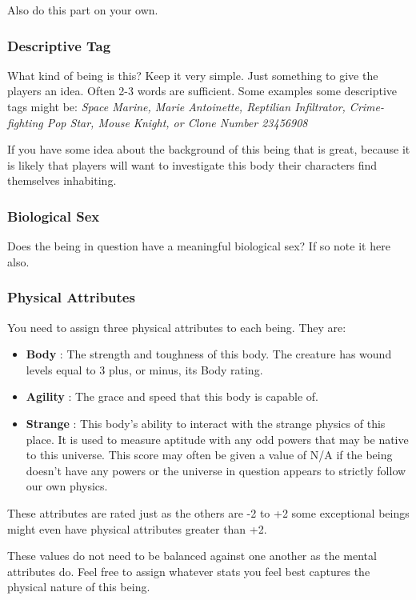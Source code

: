 \documentclass[letterpaper,12pt,landscape,twocolumn]{book}
\begin{document}
Also do this part on your own.

\subsubsection{Descriptive Tag}

What kind of being is this? Keep it very simple. Just something to
give the players an idea. Often 2-3 words are sufficient. Some examples
some descriptive tags might be: \textit{Space Marine, Marie
  Antoinette, Reptilian Infiltrator, Crime-fighting Pop Star, Mouse
  Knight, or Clone Number 23456908} 

If you have some idea about the background of this being that is
great, because it is likely that players will want to investigate this
body their characters find themselves inhabiting.

\subsubsection{Biological Sex}
Does the being in question have a meaningful biological sex? If so
note it here also. 

\subsubsection{Physical Attributes}

You need to assign three physical attributes to each being. They are:

\begin{itemize}
\item \textbf{Body} : The strength and toughness of this body. The
  creature has wound levels equal to 3 plus, or minus, its Body rating.
\item \textbf{Agility} : The grace and speed that this body is capable
  of. 
\item \textbf{Strange} : This body's ability to interact with the
  strange physics of this place. It is used to measure aptitude with
  any odd powers that may be native to this universe. This score may
  often be given a value of N/A if the being doesn't have any powers
  or the universe in question appears to strictly follow our own
  physics.  
\end{itemize}

These attributes are rated just as the others are -2 to +2 some
exceptional beings might even have physical attributes greater than
+2. 

These values do not need to be balanced against one another as the
mental attributes do. Feel free to assign whatever stats you feel best
captures the physical nature of this being. 
\end{document}
